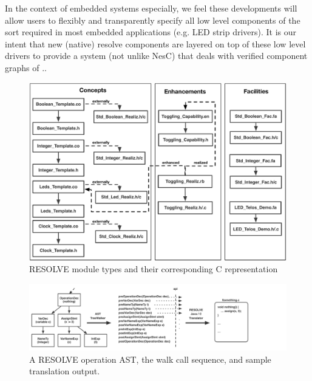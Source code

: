 In the context of embedded systems especially, we feel these developments will allow users to flexibly and transparently specify all low level components of the sort required in most embedded applications (e.g. LED strip drivers). It is our intent that new (native) resolve components are layered on top of these low level drivers to provide a system (not unlike NesC) that deals with verified component graphs of ..






\begin{figure}[!htb]
\centering
\includegraphics[scale=.45]{figs/implementation.pdf}
\caption{RESOLVE module types and their corresponding C representation}
\end{figure}
\label{fig:imp}

\begin{figure}
\centering
\includegraphics[scale=.55]{figs/ast_traversal.pdf}
\caption{A RESOLVE operation AST, the walk call sequence, and sample translation output.}
\end{figure}
\label{fig:ast}